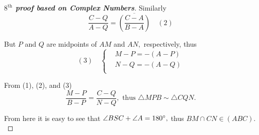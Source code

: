 \documentclass{article}
\begin{document}
\begin{proof}[\textbf{$8^{\text{th}}$ proof based on Complex Numbers}]
    Similarly 
    \[
        \frac{C-Q}{A-Q} = \overline{ \left(\frac{C-A}{B-A}\right) } \quad (2)
    \]

    But $P$ and $Q$ are midpoints of $AM$ and $AN,$ respectively, thus
    \[
        (3) \quad 
        \begin{cases} 
            &M- P = -(A-P)\\
            &N-Q = -(A-Q)\\
        \end{cases}
    \]

    From (1), (2), and (3) 
    \[
        \frac{M - P}{B -P} = \frac{C- Q}{N- Q}, \text{ thus } \triangle MPB \sim \triangle CQN.
    \]

    From here it is easy to see that $\angle BSC + \angle A = 180^\circ,$ thus $BM \cap CN \in (ABC).$
\end{proof}
\end{document}
